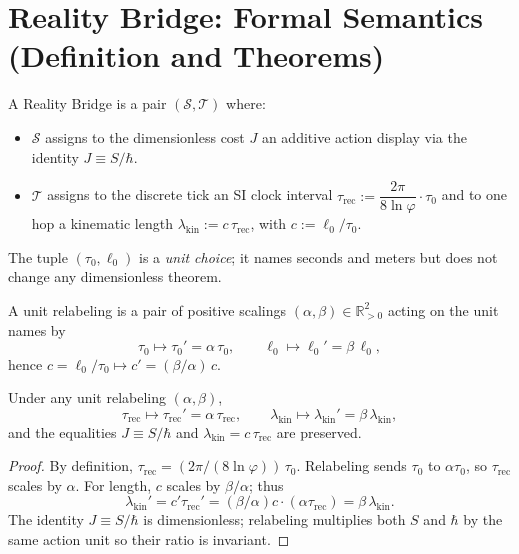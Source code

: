 \documentclass[11pt]{article}
\begin{document}
\section{Reality Bridge: Formal Semantics (Definition and Theorems)}

\begin{definition}
A Reality Bridge is a pair \((\mathcal{S},\mathcal{T})\) where:
\begin{itemize}
  \item \(\mathcal{S}\) assigns to the dimensionless cost \(J\) an additive action display via the identity \(J \equiv S/\hbar\).
  \item \(\mathcal{T}\) assigns to the discrete tick an SI clock interval \(\tau_{\mathrm{rec}} := \dfrac{2\pi}{8\ln\varphi}\cdot \tau_{0}\) and to one hop a kinematic length \(\lambda_{\mathrm{kin}} := c\,\tau_{\mathrm{rec}}\), with \(c:=\ell_{0}/\tau_{0}\).
\end{itemize}
The tuple \((\tau_{0},\ell_{0})\) is a \emph{unit choice}; it names seconds and meters but does not change any dimensionless theorem.
\end{definition}

\begin{definition}
A unit relabeling is a pair of positive scalings \((\alpha,\beta)\in\mathbb{R}_{>0}^2\) acting on the unit names by
\[
\tau_{0}\mapsto \tau_{0}'=\alpha\,\tau_{0},\qquad
\ell_{0}\mapsto \ell_{0}'=\beta\,\ell_{0},
\]
hence \(c=\ell_{0}/\tau_{0}\mapsto c'=(\beta/\alpha)\,c\).
\end{definition}

\begin{lemma}
Under any unit relabeling \((\alpha,\beta)\),
\[
\tau_{\mathrm{rec}}\mapsto \tau_{\mathrm{rec}}'=\alpha\,\tau_{\mathrm{rec}},\qquad
\lambda_{\mathrm{kin}}\mapsto \lambda_{\mathrm{kin}}'=\beta\,\lambda_{\mathrm{kin}},
\]
and the equalities \(J\equiv S/\hbar\) and \(\lambda_{\mathrm{kin}}=c\,\tau_{\mathrm{rec}}\) are preserved.
\end{lemma}

\begin{proof}
By definition, \(\tau_{\mathrm{rec}}=(2\pi/(8\ln\varphi))\,\tau_{0}\). Relabeling sends \(\tau_{0}\) to \(\alpha\tau_{0}\), so \(\tau_{\mathrm{rec}}\) scales by \(\alpha\). For length, \(c\) scales by \(\beta/\alpha\); thus
\[
\lambda_{\mathrm{kin}}'=c'\tau_{\mathrm{rec}}'=(\beta/\alpha)c\cdot(\alpha\tau_{\mathrm{rec}})=\beta\,\lambda_{\mathrm{kin}}.
\]
The identity \(J\equiv S/\hbar\) is dimensionless; relabeling multiplies both \(S\) and \(\hbar\) by the same action unit so their ratio is invariant.
\end{proof}
\end{document}
